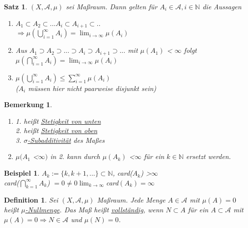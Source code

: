 \documentclass[11pt]{memoir}
\theoremstyle{break}
\newtheorem{Definition}{Definition}[chapter]
\newtheorem{Bemerkung}{Bemerkung}[chapter]
\newtheorem{Beispiel}{Beispiel}[chapter]
\newtheorem{Satz}{Satz}[chapter]
\begin{document}
\begin{Satz}
$(X, \mathscr{A}, \mu)$ sei Maßraum. Dann gelten für $A_i \in \mathscr{A}, i \in \mathbb{N}$ die Aussagen
\begin{enumerate}
	\item $A_1 \subset A_2 \subset ...  A_i \subset A_{i+1} \subset .. $\\
	$\Rightarrow \mu(\bigcup\limits_{i=1}^{\infty} A_i) = \lim_{i \rightarrow \infty} \mu(A_i)$
	\item Aus $A_1 \supset A_2 \supset ... \supset A_i \supset A_{i+1} \supset ...$ mit $\mu(A_1)$ \textless  {} $ \infty$ folgt\\
	$\mu(\bigcap\limits_{i=1}^{\infty} A_i) = \lim_{i \rightarrow \infty} \mu(A_i)$
	\item $\mu(\bigcup\limits_{i=1}^{\infty} A_i) \leq \sum\limits_{i=1}^{\infty} \mu(A_i)$ \\
	($A_i$ müssen hier nicht paarweise disjunkt sein)
\end{enumerate}
\end{Satz}

\begin{Bemerkung}
\begin{enumerate}
	\item \emph{1.} heißt \underline{Stetigkeit von unten} \\
	\emph{2.} heißt \underline{Stetigkeit von oben} \\
	\emph{3.} \underline{$\sigma$-Subadditivität} des Maßes
	\item  $\mu(A_1$ \textless $\infty)$ in \emph{2.} kann durch $\mu(A_k) $ \textless  $\infty$ für ein $k \in \mathbb{N}$ ersetzt werden.
\end{enumerate}
\end{Bemerkung}

\begin{Beispiel}
$A_k := \{k, k+1, ... \} \subset \mathbb{N}$, card($A_k$) \textgreater $ \infty$ \\
card($\bigcap\limits_{k=1}^{\infty} A_k$) $= 0 \ne 0 \lim_{k \rightarrow \infty} $card$ (A_k) = \infty$
\end{Beispiel}

\begin{Definition}
Sei $(X, \mathscr{A}, \mu)$ Maßraum. Jede Menge $A \in \mathscr{A}$ mit $\mu(A) = 0$ heißt \underline{$\mu$-Nullmenge}. Das Maß heißt \underline{vollständig}, wenn $N \subset A $ für ein $A \subset \mathscr{A}$ mit $\mu(A) = 0 \Rightarrow N \in \mathscr{A}$ und $\mu(N) = 0$.
\end{Definition}
\end{document}

